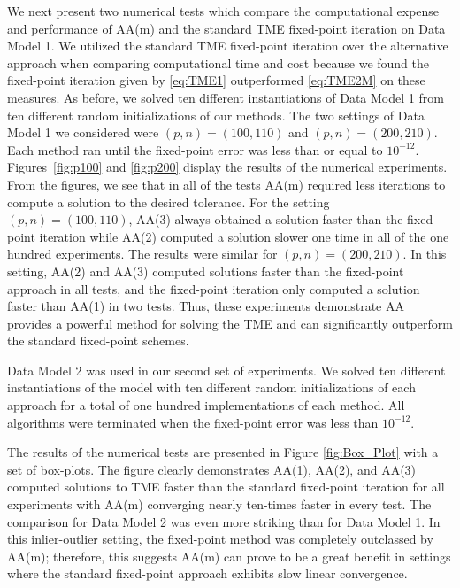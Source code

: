 \documentclass[11pt]{article}
\begin{document}
We next present two numerical tests which compare the computational expense and performance of AA(m) and the standard TME fixed-point iteration on Data Model 1. 
We utilized the standard TME fixed-point iteration over the alternative approach when comparing computational time and cost because 
we found the fixed-point iteration given by \eqref{eq:TME1} outperformed \eqref{eq:TME2M} on these measures. 
As before, we solved ten different instantiations of Data Model 1 from ten different random initializations of our methods. The two settings of Data Model 1 we considered were $(p,n)=(100,110)$ and $(p,n)=(200,210)$. Each method ran until the fixed-point error was less than or equal to $10^{-12}$. Figures~\ref{fig:p100} and \ref{fig:p200} display the results of the numerical experiments. From the figures, we see that in all of the tests AA(m) required less iterations to compute a solution to the desired tolerance. For the setting $(p,n)=(100,110)$, AA(3) always obtained a solution faster than the fixed-point iteration while AA(2) computed a solution slower one time in all of the one hundred experiments. The results were similar for $(p,n)=(200,210)$. In this setting, AA(2) and AA(3) computed solutions faster than the fixed-point approach in all tests, and the fixed-point iteration only computed a solution faster than AA(1) in two tests. Thus, these experiments demonstrate AA provides a powerful method for solving the TME and can significantly outperform the standard fixed-point schemes. 

Data Model 2 was used in our second set of experiments. 
We solved ten different instantiations of the model with ten different random initializations of each approach for a total of one hundred implementations of each method. 
All algorithms were terminated when the fixed-point error was less than $10^{-12}$.  

The results of the numerical tests are presented in Figure \ref{fig:Box_Plot} with a set of box-plots. The figure clearly demonstrates AA(1), AA(2), and AA(3) computed solutions to TME faster than the standard fixed-point iteration for all experiments with AA(m) converging nearly ten-times faster in every test. The comparison for Data Model 2 was even more striking than for Data Model 1. 
In this inlier-outlier setting, the fixed-point method was completely outclassed by AA(m); therefore, this suggests AA(m) can prove to be a great benefit in settings where the standard fixed-point approach exhibits slow linear convergence.  
\end{document}
